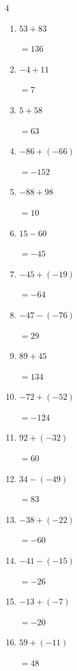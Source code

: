 \begin{multicols}{4}
\begin{enumerate}
        $=-1$

  \item $53+83$

        $=136$

  \item $-4+11$

        $=7$

  \item $5+58$

        $=63$

  \item $-86+(-66)$

        $=-152$

  \item $-88+98$

        $=10$

  \item $15-60$

        $=-45$

  \item $-45+(-19)$

        $=-64$

  \item $-47-(-76)$

        $=29$

  \item $89+45$

        $=134$

\columnbreak %

\resetques

  \item $-72+(-52)$

        $=-124$

  \item $92+(-32)$

        $=60$

  \item $34-(-49)$

        $=83$

  \item $-38+(-22)$

        $=-60$

  \item $-41-(-15)$

        $=-26$

  \item $-13+(-7)$

        $=-20$

  \item $59+(-11)$

        $=48$


\end{enumerate}
\end{multicols}

